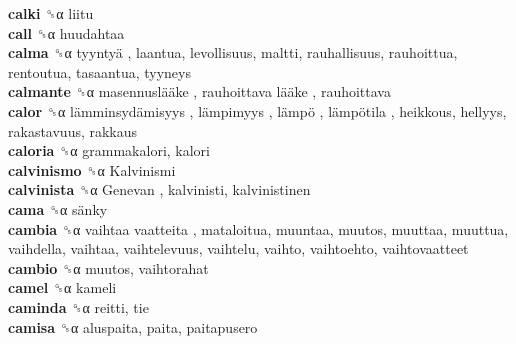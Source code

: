 \textbf{calki} ␝α  liitu  \\
\textbf{call} ␝α  huudahtaa  \\
\textbf{calma} ␝α   tyyntyä , laantua, levollisuus, maltti, rauhallisuus, rauhoittua, rentoutua, tasaantua, tyyneys  \\
\textbf{calmante} ␝α   masennuslääke ,  rauhoittava lääke , rauhoittava  \\
\textbf{calor} ␝α   lämminsydämisyys ,  lämpimyys ,  lämpö ,  lämpötila , heikkous, hellyys, rakastavuus, rakkaus  \\
\textbf{caloria} ␝α  grammakalori, kalori  \\
\textbf{calvinismo} ␝α   Kalvinismi   \\
\textbf{calvinista} ␝α   Genevan , kalvinisti, kalvinistinen  \\
\textbf{cama} ␝α   sänky   \\
\textbf{cambia} ␝α   vaihtaa vaatteita , mataloitua, muuntaa, muutos, muuttaa, muuttua, vaihdella, vaihtaa, vaihtelevuus, vaihtelu, vaihto, vaihtoehto, vaihtovaatteet  \\
\textbf{cambio} ␝α  muutos, vaihtorahat  \\
\textbf{camel} ␝α  kameli  \\
\textbf{caminda} ␝α  reitti, tie  \\
\textbf{camisa} ␝α  aluspaita, paita, paitapusero  \\
